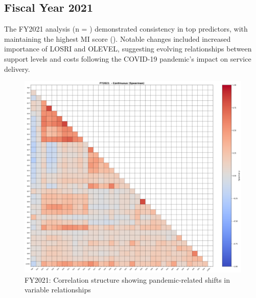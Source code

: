 \newpage

\subsection{Fiscal Year 2021}

The FY2021 analysis (n = \FSRecordsFinalFYTwoThousandTwentyOne) demonstrated consistency in top predictors, with \FSTopFeatureFYTwoThousandTwentyOne{} maintaining the highest MI score (\FSTopMIFYTwoThousandTwentyOne). Notable changes included increased importance of LOSRI and OLEVEL, suggesting evolving relationships between support levels and costs following the COVID-19 pandemic's impact on service delivery.

\vspace*{\fill}
\begin{figure}[htbp]
\centering
\includegraphics[width=\textwidth]{fy2021_continuous_spearman.png}
\caption{FY2021: Correlation structure showing pandemic-related shifts in variable relationships}
\end{figure}
\vspace*{\fill}

\newpage

